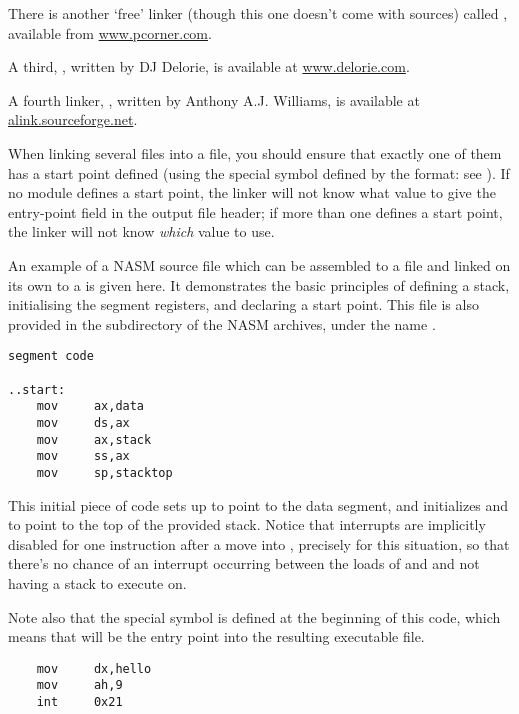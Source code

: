 There is another `free' linker (though this one doesn't come with
sources) called , available
from \href{http://www.pcorner.com/tpc/old/3-101.html}{www.pcorner.com}.

A third, , written by DJ Delorie, is available at
\href{http://www.delorie.com/djgpp/16bit/djlink/}{www.delorie.com}.

A fourth linker, , written by
Anthony A.J. Williams, is available at \href{http://alink.sourceforge.net}
{alink.sourceforge.net}.

When linking several  files into a  file, you should
ensure that exactly one of them has a start point defined (using the
 special symbol defined by the
 format: see ). If no module defines a start
point, the linker will not know what value to give the entry-point
field in the output file header; if more than one defines a start
point, the linker will not know \emph{which} value to use.

An example of a NASM source file which can be assembled to a
 file and linked on its own to a  is given here. It
demonstrates the basic principles of defining a stack, initialising
the segment registers, and declaring a start point. This file is
also provided in the  subdirectory of
the NASM archives, under the name .

\begin{lstlisting}
segment code

..start:
    mov     ax,data
    mov     ds,ax
    mov     ax,stack
    mov     ss,ax
    mov     sp,stacktop
\end{lstlisting}

This initial piece of code sets up  to point to the data
segment, and initializes  and  to point to the top of
the provided stack. Notice that interrupts are implicitly disabled
for one instruction after a move into , precisely for this
situation, so that there's no chance of an interrupt occurring
between the loads of  and  and not having a stack to
execute on.

Note also that the special symbol  is defined at the
beginning of this code, which means that will be the entry point
into the resulting executable file.

\begin{lstlisting}
    mov     dx,hello
    mov     ah,9
    int     0x21
\end{lstlisting}

